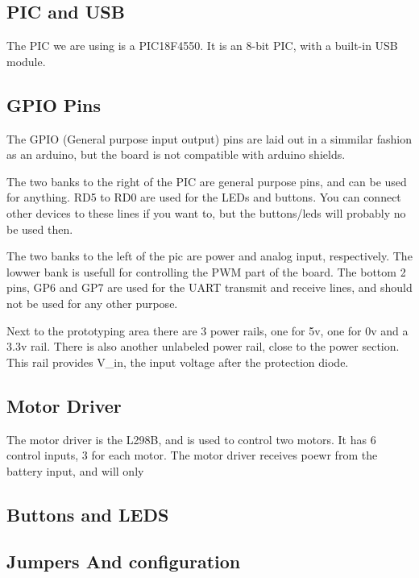 \documentclass{article}
\begin{document}
\subsection{PIC and USB}
The PIC we are using is a PIC18F4550. It is an 8-bit PIC, with a built-in USB module.

\subsection{GPIO Pins}
The GPIO (General purpose input output) pins are laid out in a simmilar fashion as an arduino, but the board is not compatible with arduino shields.

The two banks to the right of the PIC are general purpose pins, and can be used for anything. RD5 to RD0 are used for the LEDs and buttons. You can connect other devices to these lines if you want to, but the buttons/leds will probably no be used then.

The two banks to the left of the pic are power and analog input, respectively. The lowwer bank is usefull for controlling the PWM part of the board. The bottom 2 pins, GP6 and GP7 are used for the UART transmit and receive lines, and should not be used for any other purpose.

Next to the prototyping area there are 3 power rails, one for 5v, one for 0v and a 3.3v rail. There is also another unlabeled power rail, close to the power section. This rail provides V\_in, the input voltage after the protection diode.

\subsection{Motor Driver}
The motor driver is the L298B, and is used to control two motors. It has 6 control inputs, 3 for each motor. The motor driver receives poewr from the battery input, and will only 

\subsection{Buttons and LEDS}

\subsection{Jumpers And configuration}
\label{jumper_section}
\end{document}
